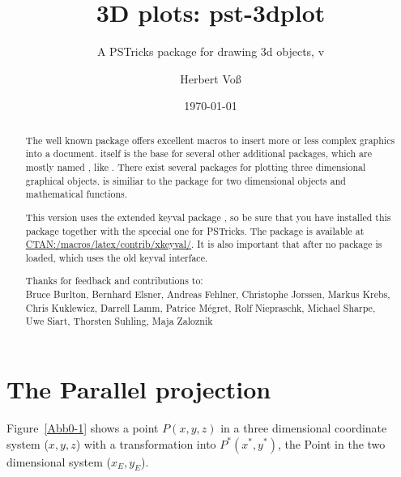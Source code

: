 \documentclass[11pt,english,bibliography=totoc,parskip=false,headings=small,
    headinclude=false,footinclude=false,twoside,english,usegeometry]{pst-doc}
\let\pstFV\IIIDplotfileversion
\begin{document}
\author{Herbert Voß}
\date{\today}
\title{3D plots: pst-3dplot}
\subtitle{A PSTricks package for drawing 3d objects,  v\pstFV}
\settitle
{}

\tableofcontents




\clearpage
\begin{abstract}
The well known  package offers excellent macros to insert more or less complex 
graphics into a document.  itself is the base for several other additional packages, 
which are mostly named , like .
%
There exist several packages for plotting three dimensional graphical objects.  
is similiar to the  package for two dimensional objects and mathematical functions.

This version uses the extended keyval package , so be sure that you have installed
this package together with the spcecial one  for PSTricks. The 
package is available at \href{http://www.dante.de/CTAN/macros/latex/contrib/xkeyval/}{CTAN:/macros/latex/contrib/xkeyval/}.
It is also important that after  no package is loaded, which uses the old keyval interface.

\vfill\noindent
Thanks for feedback and contributions to:\\
Bruce Burlton, Bernhard Elsner, Andreas Fehlner, 
Christophe Jorssen, Markus Krebs, Chris Kuklewicz, Darrell Lamm, 
Patrice Mégret, 
Rolf Niepraschk,  
Michael Sharpe, Uwe Siart, Thorsten Suhling, Maja Zaloznik 

\end{abstract}
\clearpage

\section{The Parallel projection}

Figure~\ref{Abb0-1} shows a point $P(x,y,z)$ in a three dimensional coordinate system ($x,y,z$) 
with a transformation into $P^*(x^*,y^*)$, the Point in the two dimensional system ($x_E,y_E$).
\end{document}
